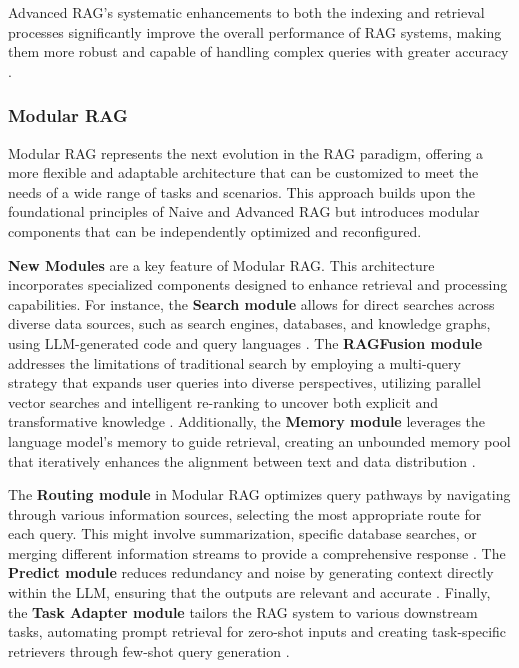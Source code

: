 Advanced RAG’s systematic enhancements to both the indexing and retrieval processes significantly improve the overall performance of RAG systems, making them more robust and capable of handling complex queries with greater accuracy \cite{gao2023retrieval}.

\subsubsection{Modular RAG}

Modular RAG represents the next evolution in the RAG paradigm, offering a more flexible and adaptable architecture that can be customized to meet the needs of a wide range of tasks and scenarios. This approach builds upon the foundational principles of Naive and Advanced RAG but introduces modular components that can be independently optimized and reconfigured.

\textbf{New Modules} are a key feature of Modular RAG. This architecture incorporates specialized components designed to enhance retrieval and processing capabilities. For instance, the \textbf{Search module} allows for direct searches across diverse data sources, such as search engines, databases, and knowledge graphs, using LLM-generated code and query languages \cite{wang2023knowledgpt}. The \textbf{RAGFusion module} addresses the limitations of traditional search by employing a multi-query strategy that expands user queries into diverse perspectives, utilizing parallel vector searches and intelligent re-ranking to uncover both explicit and transformative knowledge \cite{ragfusion2023}. Additionally, the \textbf{Memory module} leverages the language model’s memory to guide retrieval, creating an unbounded memory pool that iteratively enhances the alignment between text and data distribution \cite{li2021memory}.

The \textbf{Routing module} in Modular RAG optimizes query pathways by navigating through various information sources, selecting the most appropriate route for each query. This might involve summarization, specific database searches, or merging different information streams to provide a comprehensive response \cite{li2023classification}. The \textbf{Predict module} reduces redundancy and noise by generating context directly within the LLM, ensuring that the outputs are relevant and accurate \cite{yu2022generate}. Finally, the \textbf{Task Adapter module} tailors the RAG system to various downstream tasks, automating prompt retrieval for zero-shot inputs and creating task-specific retrievers through few-shot query generation \cite{cheng2023uprise}.

